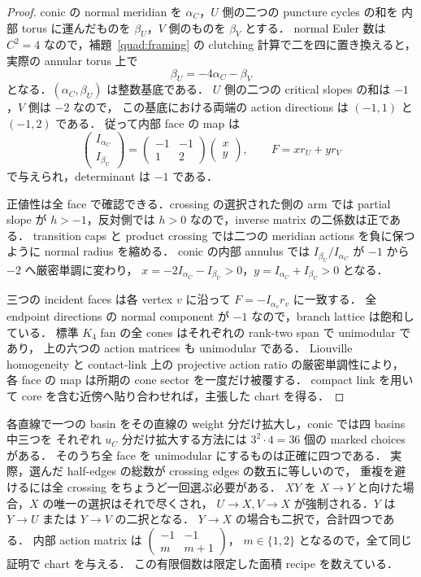 \begin{proof}
conic の normal meridian を $\alpha_C$，$U$ 側の二つの puncture cycles の和を
内部 torus に運んだものを $\beta_U$，$V$ 側のものを $\beta_V$ とする．
normal Euler 数は $C^2=4$ なので，補題~\ref{quad:framing} の clutching 計算で二を四に置き換えると，
実際の annular torus 上で
\[
 \beta_U=-4\alpha_C-\beta_V
\]
となる．$(\alpha_C,\beta_U)$ は整数基底である．
$U$ 側の二つの critical slopes の和は $-1$，$V$ 側は $-2$ なので，
この基底における両端の action directions は $(-1,1)$ と $(-1,2)$ である．
従って内部 face の map は
\[
 \begin{pmatrix}I_{\alpha_C}\\I_{\beta_U}\end{pmatrix}
 =\begin{pmatrix}-1&-1\\1&2\end{pmatrix}
   \begin{pmatrix}x\\y\end{pmatrix},\qquad
 F=xr_U+yr_V
\]
で与えられ，determinant は $-1$ である．

正値性は全 face で確認できる．crossing の選択された側の arm では partial slope が
$h>-1$，反対側では $h>0$ なので，inverse matrix の二係数は正である．
transition caps と product crossing では二つの meridian actions を負に保つように normal radius を縮める．
conic の内部 annulus では $I_{\beta_U}/I_{\alpha_C}$ が $-1$ から $-2$ へ厳密単調に変わり，
$x=-2I_{\alpha_C}-I_{\beta_U}>0$，$y=I_{\alpha_C}+I_{\beta_U}>0$ となる．

三つの incident faces は各 vertex $v$ に沿って $F=-I_{\alpha_v}r_v$ に一致する．
全 endpoint directions の normal component が $-1$ なので，branch lattice は飽和している．
標準 $K_4$ fan の全 cones はそれぞれの rank-two span で unimodular であり，
上の六つの action matrices も unimodular である．
Liouville homogeneity と contact-link 上の projective action ratio の厳密単調性により，
各 face の map は所期の cone sector を一度だけ被覆する\cite[Remarks 2.11--2.12]{EM}．
compact link を用いて core を含む近傍へ貼り合わせれば，主張した chart を得る．
\end{proof}

\begin{remark}\label{mixper:four}
各直線で一つの basin をその直線の weight 分だけ拡大し，conic では四 basins 中三つを
それぞれ $u_C$ 分だけ拡大する方法には $3^2\cdot4=36$ 個の marked choices がある．
そのうち全 face を unimodular にするものは正確に四つである．
実際，選んだ half-edges の総数が crossing edges の数五に等しいので，
重複を避けるには全 crossing をちょうど一回選ぶ必要がある．
$XY$ を $X\to Y$ と向けた場合，$X$ の唯一の選択はそれで尽くされ，
$U\to X,V\to X$ が強制される．$Y$ は $Y\to U$ または $Y\to V$ の二択となる．
$Y\to X$ の場合も二択で，合計四つである．
内部 action matrix は $\left(\begin{smallmatrix}-1&-1\\m&m+1\end{smallmatrix}\right)$，
$m\in\{1,2\}$ となるので，全て同じ証明で chart を与える．
この有限個数は限定した面積 recipe を数えている．
\end{remark}

